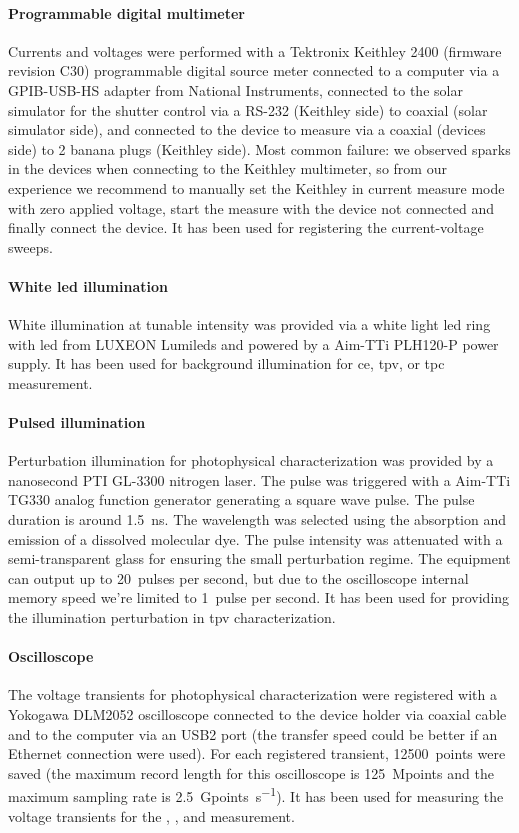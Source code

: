 		\paragraph{Programmable digital multimeter} Currents and voltages were performed with a Tektronix Keithley 2400 (firmware revision C30) programmable digital source meter connected to a computer via a GPIB-USB-HS adapter from National Instruments, connected to the solar simulator for the shutter control via a RS-232 (Keithley side) to coaxial (solar simulator side), and connected to the device to measure via a coaxial (devices side) to 2 banana plugs (Keithley side).
		Most common failure: we observed sparks in the devices when connecting to the Keithley multimeter, so from our experience we recommend to manually set the Keithley in current measure mode with zero applied voltage, start the measure with the device not connected and finally connect the device.
		It has been used for registering the current-voltage sweeps.

		\paragraph{White \gls{led} illumination} White illumination at tunable intensity was provided via a white light \gls{led} ring with \gls{led} from LUXEON Lumileds and powered by a Aim-TTi PLH120-P power supply.
		It has been used for background illumination for \acrfull{ce}, \acrfull{tpv}, or \acrfull{tpc} measurement.

		\paragraph{Pulsed illumination} Perturbation illumination for photophysical characterization was provided by a nanosecond PTI GL-3300 nitrogen laser. The pulse was triggered with a Aim-TTi TG330 analog function generator generating a square wave pulse. The pulse duration is around \SI{1.5}{\ns}. The wavelength was selected using the absorption and emission of a dissolved molecular dye.
		The pulse intensity was attenuated with a semi-transparent glass for ensuring the small perturbation regime. The equipment can output up to 20~pulses per second, but due to the oscilloscope internal memory speed we're limited to 1~pulse per second.
		It has been used for providing the illumination perturbation in \acrshort{tpv} characterization.

		\paragraph{Oscilloscope} The voltage transients for photophysical characterization were registered with a Yokogawa DLM2052 oscilloscope connected to the device holder via coaxial cable and to the computer via an USB2 port (the transfer speed could be better if an Ethernet connection were used). For each registered transient, \SI{12500}{points} were saved (the maximum record length for this oscilloscope is \SI{125}{Mpoints} and the maximum sampling rate is \SI{2.5}{Gpoints\per\s}).
		It has been used for measuring the voltage transients for the , , and  measurement.

